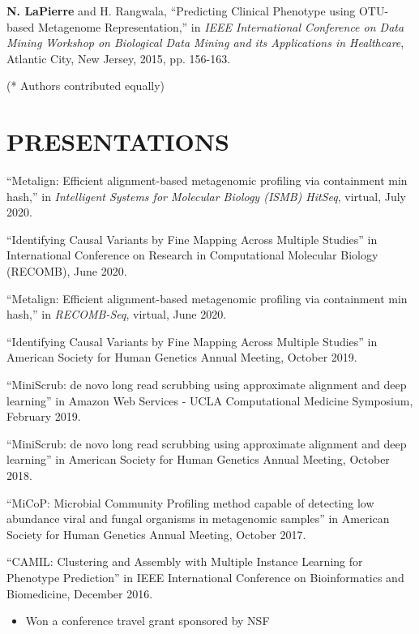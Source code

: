 \documentclass[margin, 10pt]{res} %
\begin{document}
\begin{resume}
\textbf{N. LaPierre} and H. Rangwala, ``Predicting Clinical Phenotype using OTU-based Metagenome Representation,'' in {\sl IEEE International Conference on Data Mining Workshop on Biological Data Mining and its Applications in Healthcare}, Atlantic City, New Jersey, 2015, pp. 156-163.

(*  Authors contributed equally)


\section{PRESENTATIONS}
``Metalign: Efficient alignment-based metagenomic profiling via containment min hash,'' in {\sl Intelligent Systems for Molecular Biology (ISMB) HitSeq}, virtual, July 2020.

``Identifying Causal Variants by Fine Mapping Across Multiple Studies'' in International Conference on Research in Computational Molecular Biology (RECOMB), June 2020.

``Metalign: Efficient alignment-based metagenomic profiling via containment min hash,'' in {\sl RECOMB-Seq}, virtual, June 2020.

``Identifying Causal Variants by Fine Mapping Across Multiple Studies'' in American Society for Human Genetics Annual Meeting, October 2019.

``MiniScrub: de novo long read scrubbing using approximate alignment and deep learning'' in Amazon Web Services - UCLA Computational Medicine Symposium, February 2019.

``MiniScrub: de novo long read scrubbing using approximate alignment and deep learning'' in American Society for Human Genetics Annual Meeting, October 2018.

``MiCoP: Microbial Community Profiling method capable of detecting low abundance viral and fungal organisms in metagenomic samples'' in American Society for Human Genetics Annual Meeting, October 2017.

``CAMIL: Clustering and Assembly with Multiple Instance Learning for Phenotype Prediction'' in IEEE International Conference on Bioinformatics and Biomedicine, December 2016.
\begin{itemize} \itemsep -2pt %
\item Won a conference travel grant sponsored by NSF
\end{itemize}


\end{resume}
\end{document}
